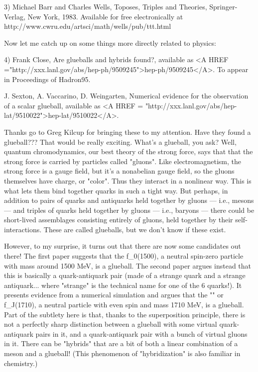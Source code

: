 3) Michael Barr and Charles Wells, Toposes, Triples and Theories,
Springer-Verlag, New York, 1983.  Available for free electronically
at http://www.cwru.edu/artsci/math/wells/pub/ttt.html


Now let me catch up on some things more directly related to physics:

4) Frank Close, Are glueballs and hybrids found?, available as
<A HREF ="http://xxx.lanl.gov/abs/hep-ph/9509245">hep-ph/9509245</A>.
To appear in Proceedings of Hadron95.

J. Sexton, A. Vaccarino, D. Weingarten, Numerical evidence for the
observation of a scalar glueball, available as <A HREF = "http://xxx.lanl.gov/abs/hep-lat/9510022">hep-lat/9510022</A>.

Thanks go to Greg Kilcup for bringing these to my attention.  Have they
found a glueball???  That would be really exciting.  What's a glueball,
you ask?  Well, quantum chromodynamics, our best theory of the strong
force, says that that the strong force is carried by particles called
"gluons".  Like electromagnetism, the strong force is a gauge field, but
it's a nonabelian gauge field, so the gluons themselves have charge, or
"color".  Thus they interact in a nonlinear way.  This is what lets them
bind together quarks in such a tight way.  But perhaps, in addition to
pairs of quarks and antiquarks held together by gluons --- i.e., mesons
--- and triples of quarks held together by gluons --- i.e., baryons ---
there could be short-lived assemblages consisting entirely of gluons,
held together by their self-interactions.  These are called glueballs, but
we don't know if these exist.  

However, to my surprise, it turns out that there are now some candidates
out there!  The first paper suggests that the f_0(1500), a neutral
spin-zero particle with mass around 1500 MeV, is a glueball.  The second
paper argues instead that this is basically a quark-antiquark pair (made
of a strange quark and a strange antiquark... where "strange" is the
technical name for one of the 6 quarks!).  It presents evidence from a
numerical simulation and argues that the "\theta " or f_J(1710), a
neutral particle with even spin and mass 1710 MeV, is a glueball.
Part of the
subtlety here is that, thanks to the superposition principle, there is
not a perfectly sharp distinction between a glueball with some virtual
quark-antiquark pairs in it, and a quark-antiquark pair with a bunch of
virtual gluons in it.  There can be "hybrids" that are a bit of both
a linear combination of a meson and a glueball!  
(This phenomenon of "hybridization" is also familiar in chemistry.)


